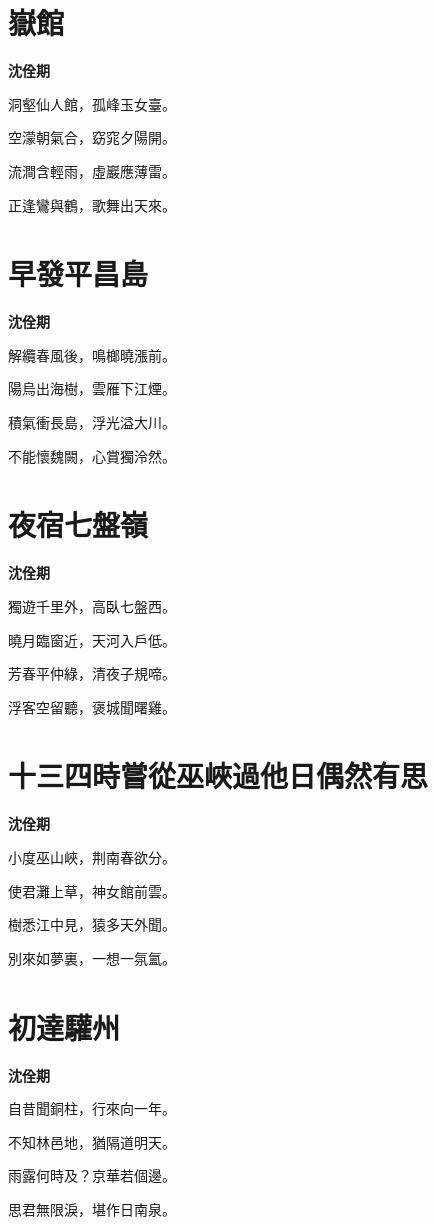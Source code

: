 \documentclass[12pt,a4paper]{ctexbook}
\begin{document}
\section{嶽館}
\textbf{沈佺期}\par\vspace{0.5em}
洞壑仙人館，孤峰玉女臺。\par
空濛朝氣合，窈窕夕陽開。\par
流澗含輕雨，虛巖應薄雷。\par
正逢鸞與鶴，歌舞出天來。\par

\section{早發平昌島}
\textbf{沈佺期}\par\vspace{0.5em}
解纜春風後，鳴榔曉漲前。\par
陽烏出海樹，雲雁下江煙。\par
積氣衝長島，浮光溢大川。\par
不能懷魏闕，心賞獨泠然。\par

\section{夜宿七盤嶺}
\textbf{沈佺期}\par\vspace{0.5em}
獨遊千里外，高臥七盤西。\par
曉月臨窗近，天河入戶低。\par
芳春平仲綠，清夜子規啼。\par
浮客空留聽，褒城聞曙雞。\par

\section{十三四時嘗從巫峽過他日偶然有思}
\textbf{沈佺期}\par\vspace{0.5em}
小度巫山峽，荆南春欲分。\par
使君灘上草，神女館前雲。\par
樹悉江中見，猿多天外聞。\par
別來如夢裏，一想一氛氳。\par

\section{初達驩州}
\textbf{沈佺期}\par\vspace{0.5em}
自昔聞銅柱，行來向一年。\par
不知林邑地，猶隔道明天。\par
雨露何時及？京華若個邊。\par
思君無限淚，堪作日南泉。\par
\end{document}
